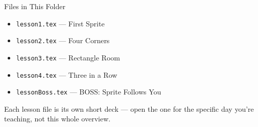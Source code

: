 \documentclass[aspectratio=169]{beamer}
\begin{document}
\begin{frame}{Files in This Folder}
    \small
    \begin{itemize}
        \item \texttt{lesson1.tex} --- First Sprite
        \item \texttt{lesson2.tex} --- Four Corners
        \item \texttt{lesson3.tex} --- Rectangle Room
        \item \texttt{lesson4.tex} --- Three in a Row
        \item \texttt{lessonBoss.tex} --- BOSS: Sprite Follows You
    \end{itemize}
    \vspace{0.5em}
    \normalsize Each lesson file is its own short deck --- open the one for
    the specific day you're teaching, not this whole overview.
\end{frame}
\end{document}
